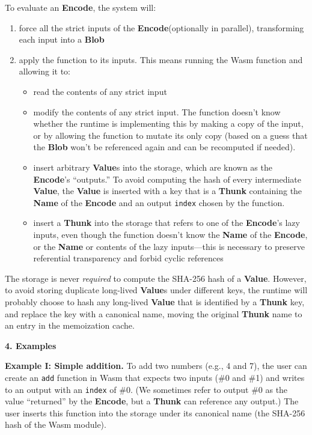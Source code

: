 \documentclass{article}
\newcommand{\blob}{\textbf{Blob}\xspace}
\newcommand{\valuex}{\textbf{Value}\xspace}
\newcommand{\valuexs}{\textbf{Value}s\xspace}
\newcommand{\encode}{\textbf{Encode}\xspace}
\newcommand{\thunk}{\textbf{Thunk}\xspace}
\newcommand{\name}{\textbf{Name}\xspace}
\begin{document}
To evaluate an \encode, the system will:
\begin{enumerate}[topsep=0pt]
\item force all the strict inputs of the \encode (optionally in parallel), transforming each input into a \blob
\item apply the function to its inputs. This means running the Wasm function and allowing it to:
\begin{itemize}[topsep=0pt]
\item read the contents of any strict input
\item modify the contents of any strict input. The function doesn't
  know whether the runtime is implementing this by making a copy of
  the input, or by allowing the function to mutate its only copy
  (based on a guess that the \blob won't be referenced again
  and can be recomputed if needed).
\item insert arbitrary \valuexs into the storage, which are known as
  the \encode's ``outputs.'' To avoid computing the hash of every
  intermediate \valuex, the \valuex is inserted with a key that
  is a \thunk containing the \name of the \encode and an output
  \texttt{index} chosen by the function.
\item insert a \thunk into the storage that refers to one of the
  \encode's lazy inputs, even though the function doesn't know the \name of
  the \encode, or the \name or contents of the lazy inputs---this is
  necessary to preserve referential transparency and forbid cyclic references
\end{itemize}
\end{enumerate}

The storage is never \emph{required} to compute the SHA-256 hash of a
\valuex. However, to avoid storing duplicate long-lived \valuexs under
different keys, the runtime will probably choose to hash any
long-lived \valuex that is identified by a \thunk key, and replace the
key with a canonical name, moving the original \thunk name to an entry
in the memoization cache.

\vspace{0.5\baselineskip}
{\Large \textbf{4. Examples}}

\textbf{Example I: Simple addition.} To add two numbers (e.g., 4 and
7), the user can create an \texttt{add} function in Wasm that expects
two inputs (\#0 and \#1) and writes to an output with an
\texttt{index} of \#0. (We sometimes refer to output \#0 as the
value ``returned'' by the \encode, but a \thunk can reference any
output.) The user inserts this function into the storage under its
canonical name (the SHA-256 hash of the Wasm module).
\end{document}
